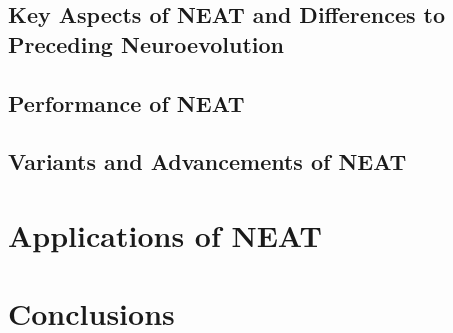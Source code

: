 \documentclass[journal, a4paper]{IEEEtran}
\begin{document}
\subsection{Key Aspects of NEAT and Differences to Preceding Neuroevolution}

\subsection{Performance of NEAT}
    
\subsection{Variants and Advancements of NEAT}




\section{Applications of NEAT}




\section{Conclusions}

\blindtext



\end{document}
